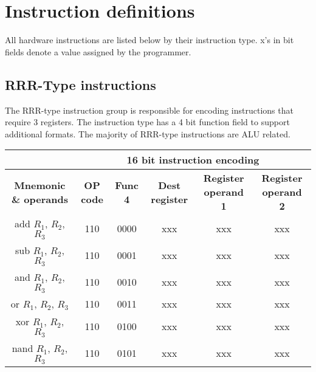 \documentclass{article}
\begin{document}
\section{Instruction definitions}
\label{id}
\begin{par}
	All hardware instructions are listed below by their instruction type. x's in bit fields denote a value assigned by the programmer. 
	\subsection{RRR-Type instructions}
	The RRR-type instruction group is responsible for encoding instructions that require 3 registers. The instruction type has a 4 bit function field to support additional formats. The majority of RRR-type instructions are ALU related. 
	\begin{center}
		\begin{tabular}{|c|c|c|c|c|c|}
			\hline 
			& \multicolumn{5}{|c|}{\textbf{16 bit instruction encoding}} \\ 
			\hline
			\textbf{Mnemonic \& operands } & \textbf{OP code} & \textbf{Func 4} & \textbf{Dest register} & \textbf{Register operand 1} & \textbf{Register operand 2} \\
			\hline 
			add $ R_{1} $, $ R_{2} $, $ R_{3} $ & 110 & 0000 & xxx & xxx & xxx \\ 
			\hline 
			sub $ R_{1} $, $ R_{2} $, $ R_{3} $ & 110 & 0001 & xxx & xxx & xxx  \\ 
			\hline 
			and $ R_{1} $, $ R_{2} $, $ R_{3} $ & 110 & 0010 & xxx & xxx & xxx  \\ 
			\hline 
			or $ R_{1} $, $ R_{2} $, $ R_{3} $ & 110 & 0011 & xxx & xxx & xxx  \\ 
			\hline 
			xor $ R_{1} $, $ R_{2} $, $ R_{3} $ & 110 & 0100 & xxx & xxx & xxx  \\ 
			\hline 
			nand $ R_{1} $, $ R_{2} $, $ R_{3} $ & 110 & 0101 & xxx & xxx & xxx  \\ 
			\hline 
		\end{tabular} 
	\end{center}

	\newpage


\end{par}
\end{document}
